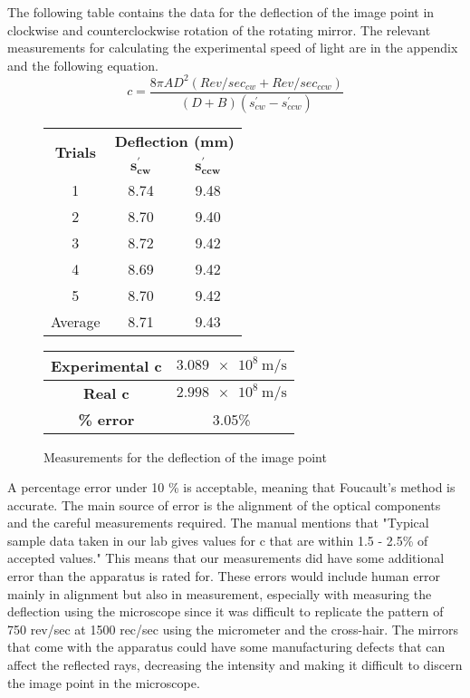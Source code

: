 \documentclass[12pt]{article}
\begin{document}
	The following table contains the data for the deflection of the image point in clockwise and counterclockwise rotation of the rotating mirror. The relevant measurements for calculating the experimental speed of light are in the appendix and the following equation.
	\[
		c = \frac{8 \pi A D^2 \left( Rev/sec_{cw} + Rev/sec_{ccw} \right)}{\left( D + B \right)\left( s^\prime_{cw} - s^\prime_{ccw} \right)}
	\]
	\begin{figure}[!h]
		\centering
		\caption{Measurements for the deflection of the image point}
		\label{FocaultTrials}
		\begin{tabular}{|c|c|c|}
			\hline
			\multirow{2}{*}{\textbf{Trials}} & \multicolumn{2}{c|}{\textbf{Deflection (mm)}} \\
			\cline{2-3}
			~ & $\bm{s^\prime_{cw}}$ & $\bm{s^\prime_{ccw}}$ \\
			\hline
			1 & 8.74 & 9.48 \\
			\hline
			2 & 8.70 & 9.40 \\
			\hline
			3 & 8.72 & 9.42 \\
			\hline
			4 & 8.69 & 9.42 \\
			\hline
			5 & 8.70 & 9.42 \\
			\hline
			Average & 8.71 & 9.43 \\
			\hline
		\end{tabular}
		\quad
		\begin{tabular}{|c|c|}
			\hline
			\textbf{Experimental c} &  $\qty{3.089e8}{\meter\per\second}$ \\
			\hline
			\textbf{Real c} & $\qty{2.998e8}{\meter\per\second}$ \\
			\hline
			\textbf{\% error} & 3.05\% \\
			\hline
		\end{tabular}
	\end{figure}
	A percentage error under 10 \% is acceptable, meaning that Foucault's method is accurate. The main source of error is the alignment of the optical components and the careful measurements required. The manual mentions that "Typical sample data taken in our lab gives values for c that are within 1.5 - 2.5\% of accepted values." This means that our measurements did have some additional error than the apparatus is rated for. These errors would include human error mainly in alignment but also in measurement, especially with measuring the deflection using the microscope since it was difficult to replicate the pattern of 750 rev/sec at 1500 rec/sec using the micrometer and the cross-hair. The mirrors that come with the apparatus could have some manufacturing defects that can affect the reflected rays, decreasing the intensity and making it difficult to discern the image point in the microscope.
\end{document}
